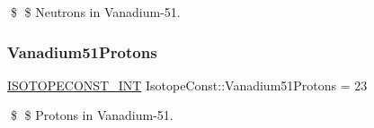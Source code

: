 \$ \$ Neutrons in Vanadium-\/51. \mbox{\label{group___isotope_const-_vanadium-_v51_ga1b9d69af3a57746c555091cffdd4286b}} 
\subsubsection{\texorpdfstring{Vanadium51\+Protons}{Vanadium51Protons}}
{\footnotesize\ttfamily \mbox{\hyperlink{group___isotope_const-_macros_ga5f18360b3e99483a35c32d789e62621c}{I\+S\+O\+T\+O\+P\+E\+C\+O\+N\+S\+T\+\_\+\+I\+NT}} Isotope\+Const\+::\+Vanadium51\+Protons = 23}

\$ \$ Protons in Vanadium-\/51. 